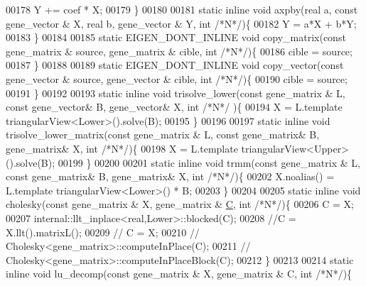 \begin{DoxyCode}
00178     Y += coef * X;
00179   \}
00180 
00181   \textcolor{keyword}{static} \textcolor{keyword}{inline} \textcolor{keywordtype}{void} axpby(real a, \textcolor{keyword}{const} gene\_vector & X, real b, gene\_vector & Y, \textcolor{keywordtype}{int}  \textcolor{comment}{/*N*/})\{
00182     Y = a*X + b*Y;
00183   \}
00184 
00185   \textcolor{keyword}{static} EIGEN\_DONT\_INLINE \textcolor{keywordtype}{void} copy\_matrix(\textcolor{keyword}{const} gene\_matrix & source, gene\_matrix & cible, \textcolor{keywordtype}{int}  \textcolor{comment}{/*N*/})\{
00186     cible = source;
00187   \}
00188 
00189   \textcolor{keyword}{static} EIGEN\_DONT\_INLINE \textcolor{keywordtype}{void} copy\_vector(\textcolor{keyword}{const} gene\_vector & source, gene\_vector & cible, \textcolor{keywordtype}{int}  \textcolor{comment}{/*N*/})\{
00190     cible = source;
00191   \}
00192 
00193   \textcolor{keyword}{static} \textcolor{keyword}{inline} \textcolor{keywordtype}{void} trisolve\_lower(\textcolor{keyword}{const} gene\_matrix & L, \textcolor{keyword}{const} gene\_vector& B, gene\_vector& X, \textcolor{keywordtype}{int}  \textcolor{comment}{/*N*/}
      )\{
00194     X = L.template triangularView<Lower>().solve(B);
00195   \}
00196 
00197   \textcolor{keyword}{static} \textcolor{keyword}{inline} \textcolor{keywordtype}{void} trisolve\_lower\_matrix(\textcolor{keyword}{const} gene\_matrix & L, \textcolor{keyword}{const} gene\_matrix& B, gene\_matrix& X, \textcolor{keywordtype}{int}
        \textcolor{comment}{/*N*/})\{
00198     X = L.template triangularView<Upper>().solve(B);
00199   \}
00200 
00201   \textcolor{keyword}{static} \textcolor{keyword}{inline} \textcolor{keywordtype}{void} trmm(\textcolor{keyword}{const} gene\_matrix & L, \textcolor{keyword}{const} gene\_matrix& B, gene\_matrix& X, \textcolor{keywordtype}{int}  \textcolor{comment}{/*N*/})\{
00202     X.noalias() = L.template triangularView<Lower>() * B;
00203   \}
00204 
00205   \textcolor{keyword}{static} \textcolor{keyword}{inline} \textcolor{keywordtype}{void} cholesky(\textcolor{keyword}{const} gene\_matrix & X, gene\_matrix & \hyperlink{group___core___module}{C}, \textcolor{keywordtype}{int}  \textcolor{comment}{/*N*/})\{
00206     C = X;
00207     internal::llt\_inplace<real,Lower>::blocked(C);
00208     \textcolor{comment}{//C = X.llt().matrixL();}
00209 \textcolor{comment}{//     C = X;}
00210 \textcolor{comment}{//     Cholesky<gene\_matrix>::computeInPlace(C);}
00211 \textcolor{comment}{//     Cholesky<gene\_matrix>::computeInPlaceBlock(C);}
00212   \}
00213 
00214   \textcolor{keyword}{static} \textcolor{keyword}{inline} \textcolor{keywordtype}{void} lu\_decomp(\textcolor{keyword}{const} gene\_matrix & X, gene\_matrix & C, \textcolor{keywordtype}{int}  \textcolor{comment}{/*N*/})\{

\end{DoxyCode}
